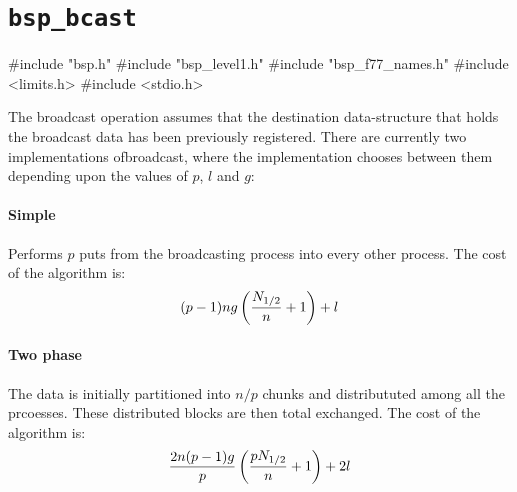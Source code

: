 \section{\texttt{bsp\_bcast}}
\begin{code}
#include "bsp.h"
#include "bsp_level1.h"
#include "bsp_f77_names.h"
#include <limits.h>
#include <stdio.h>
\end{code}

The broadcast operation assumes that the destination data-structure
that holds the broadcast data has been previously registered.  There
are currently two implementations ofbroadcast, where the
implementation chooses between them depending upon the values of $p$,
$l$ and $g$:

\paragraph{Simple}
Performs $p$ puts from the broadcasting process into every other
process.  The cost of the algorithm is:
\begin{equation}
\label{eqn:simple}
(p-1)ng\left(\frac{N_{1/2}{}}{n}+1\right) +l
\end{equation}

\paragraph{Two phase}
The data is initially partitioned into $n/p$ chunks and distribututed
among all the prcoesses. These distributed blocks are then total
exchanged. The cost of the algorithm is:
\begin{equation}
\label{eqn:complex}
\frac{2n(p-1)g}{p}\left(\frac{pN_{1/2}{}}{n}+1\right) + 2l
\end{equation}

